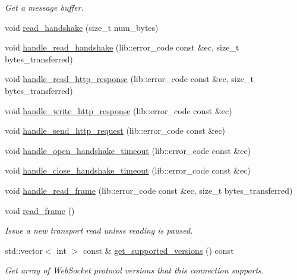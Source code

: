 \begin{DoxyCompactItemize}
\begin{DoxyCompactList}\small\item\em Get a message buffer. \end{DoxyCompactList}\item 
void \hyperlink{classwebsocketpp_1_1connection_a9e19e781b4abda3e4a39f4f25077a29c}{read\+\_\+handshake} (size\+\_\+t num\+\_\+bytes)
\item 
void \hyperlink{classwebsocketpp_1_1connection_a9c7e83aae3418cdf71e6fcf1dce3a255}{handle\+\_\+read\+\_\+handshake} (lib\+::error\+\_\+code const \&ec, size\+\_\+t bytes\+\_\+transferred)
\item 
void \hyperlink{classwebsocketpp_1_1connection_a261ca392f8b31cd0f5a1b2ccc11c3037}{handle\+\_\+read\+\_\+http\+\_\+response} (lib\+::error\+\_\+code const \&ec, size\+\_\+t bytes\+\_\+transferred)
\item 
void \hyperlink{classwebsocketpp_1_1connection_a6f2451a76c49b4c2a88de4efd4f8bda6}{handle\+\_\+write\+\_\+http\+\_\+response} (lib\+::error\+\_\+code const \&ec)
\item 
void \hyperlink{classwebsocketpp_1_1connection_af37addaf4d89de32d3d8f4da668313c5}{handle\+\_\+send\+\_\+http\+\_\+request} (lib\+::error\+\_\+code const \&ec)
\item 
void \hyperlink{classwebsocketpp_1_1connection_aee1b6e47985b434303b8d6e5f27177a3}{handle\+\_\+open\+\_\+handshake\+\_\+timeout} (lib\+::error\+\_\+code const \&ec)
\item 
void \hyperlink{classwebsocketpp_1_1connection_a129554b75156c82eb22b22e4409392c8}{handle\+\_\+close\+\_\+handshake\+\_\+timeout} (lib\+::error\+\_\+code const \&ec)
\item 
void \hyperlink{classwebsocketpp_1_1connection_abd6866c41c2ae86c3372cf428392a190}{handle\+\_\+read\+\_\+frame} (lib\+::error\+\_\+code const \&ec, size\+\_\+t bytes\+\_\+transferred)
\item 
void \hyperlink{classwebsocketpp_1_1connection_af54e9d7c8ef07349d28c3405182bb3c7}{read\+\_\+frame} ()
\begin{DoxyCompactList}\small\item\em Issue a new transport read unless reading is paused. \end{DoxyCompactList}\item 
std\+::vector$<$ int $>$ const \& \hyperlink{classwebsocketpp_1_1connection_ae6fe55e781b722c5a464f316c7bebd8e}{get\+\_\+supported\+\_\+versions} () const 
\begin{DoxyCompactList}\small\item\em Get array of Web\+Socket protocol versions that this connection supports. \end{DoxyCompactList}\item 

\end{DoxyCompactItemize}
